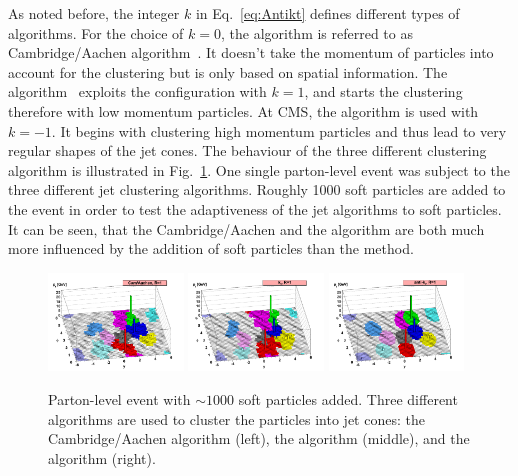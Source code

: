 As noted before, the integer $k$ in Eq.~\eqref{eq:Antikt} defines different types of algorithms.
For the choice of $k=0$, the algorithm is referred to as Cambridge/Aachen algorithm~\cite{bib:Cambridge_1997,bib:Cambridge_1998}.
It doesn't take the momentum of particles into account for the clustering but is only based on spatial information.
The \kt algorithm~\cite{bib:kT_algorithm_1993,bib:kT_algorithm_Ellis} exploits the configuration with $k=1$, and starts the clustering therefore with low momentum particles.
At CMS, the \antikt algorithm is used with $k=-1$. It begins with clustering high momentum particles and thus lead to very regular shapes of the jet cones.
The behaviour of the three different clustering algorithm is illustrated in Fig.~\ref{fig:ClusteringAlgorithms}. 
One single parton-level event was subject to the three different jet clustering algorithms.
Roughly 1000 soft particles are added to the event in order to test the adaptiveness of the jet algorithms to soft particles.
It can be seen, that the Cambridge/Aachen and the \kt algorithm are both much more influenced by the addition of soft particles than the \antikt method.
\begin{figure}[!t]
  \centering
      \includegraphics[width=0.32\textwidth]{figures/experiment/ObjectReconstruction/herwig-parton-level-ev-cam.pdf}
      \includegraphics[width=0.32\textwidth]{figures/experiment/ObjectReconstruction/herwig-parton-level-ev-kt.pdf}
      \includegraphics[width=0.32\textwidth]{figures/experiment/ObjectReconstruction/herwig-parton-level-ev-antikt.pdf}
  \caption{Parton-level event with $\sim 1000$ soft particles added. Three different algorithms are used to cluster the particles into jet cones: the Cambridge/Aachen algorithm (left), the \kt algorithm (middle), and the \antikt algorithm (right).}  
  \label{fig:ClusteringAlgorithms}
\end{figure}

